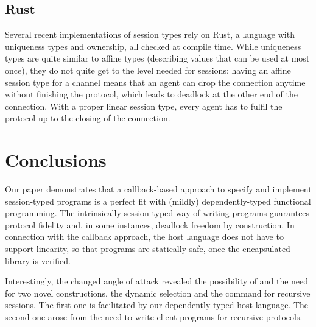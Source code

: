 \documentclass[acmsmall,review,anonymous,screen]{acmart}
\begin{document}
\subsection{Rust}
\label{sec:rust}



Several recent implementations of session types \cite{DBLP:conf/ecoop/ChenBT22,DBLP:conf/ecoop/LagaillardieNY22,DBLP:conf/ppopp/CutnerYV22,DBLP:conf/coordination/CutnerY21,DBLP:conf/coordination/LagaillardieNY20,DBLP:journals/corr/abs-1909-05970,DBLP:conf/icfp/JespersenML15} rely on Rust, a
language with uniqueness types and ownership, all checked at compile
time. While uniqueness types are quite similar to affine types
(describing values that can be used at most once), they do not quite
get to the level needed for sessions: having an affine session type
for a channel means that an agent can drop the connection anytime
without finishing the protocol, which leads to deadlock at the other
end of the connection. With a proper linear session type, every agent has to
fulfil the protocol up to the closing of the connection.


\section{Conclusions}
\label{sec:conclusions}

Our paper demonstrates that a callback-based approach to
specify and implement session-typed programs is a perfect fit with (mildly)
dependently-typed functional programming. The intrinsically
session-typed way of writing programs guarantees protocol fidelity and,
in some instances, deadlock freedom 
by construction. In connection with the callback approach, the host
language does not have to support linearity, so that programs are
statically safe, once the encapsulated library is verified.

Interestingly, the changed angle of attack revealed the possibility of
and the need for two novel constructions, the dynamic selection and
the {\AUNROLL} command for recursive sessions. The first one is
facilitated by our dependently-typed host language. The second one
arose from the need to write client programs for recursive protocols. 
\end{document}
